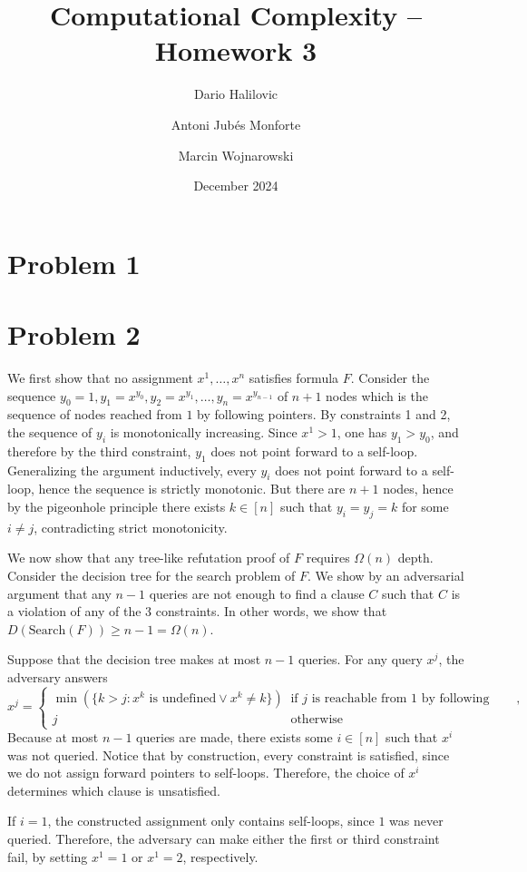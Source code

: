 \documentclass{article}
\title{Computational Complexity -- Homework 3}
\author{Dario Halilovic\and
Antoni Jubés Monforte\and
Marcin Wojnarowski}
\date{December 2024}
\begin{document}
\maketitle

\section*{Problem 1}

\section*{Problem 2}
We first show that no assignment $x^{1}, \ldots, x^{n}$ satisfies formula $F$.
Consider the sequence $y_0 = 1, y_1 = x^{y_0}, y_2 = x^{y_1}, \ldots, y_{n}
= x^{y_{n-1}}$ of $n+1$ nodes which is the sequence of nodes reached from $1$ by
following pointers. By constraints 1 and 2, the sequence of $y_i$ is
monotonically increasing. Since $x^1 > 1$, one has $y_1 > y_0$, and therefore by
the third constraint, $y_1$ does not point forward to a self-loop. Generalizing the
argument inductively, every $y_i$ does not point forward to a self-loop, hence
the sequence is strictly monotonic. But there are $n+1$ nodes, hence by the
pigeonhole principle there exists $k \in [n]$ such that $y_i = y_j = k$ for some
$i \neq j$, contradicting strict monotonicity.

We now show that any tree-like refutation proof of $F$ requires $\Omega(n)$
depth. Consider the decision tree for the search problem of $F$. We show by an
adversarial argument that any $n - 1$ queries are not enough to find a clause
$C$ such that $C$ is a violation of any of the 3 constraints. In other words, we
show that $D(\textrm{Search}(F)) \geq n - 1 = \Omega(n)$.

Suppose that the decision tree makes at most $n - 1$ queries. For any query
$x^{j}$, the adversary answers \[ x^j = \begin{cases} \min(\{k > j : x^k
	\textrm{ is undefined} \lor x^k \neq k\}) & \textrm{if } j \textrm{ is
	reachable from 1 by following pointers}, \\ j     & \textrm{otherwise}
\end{cases} \] Because at most $n - 1$ queries are made, there exists some $i
\in [n]$ such that $x^i$ was not queried. Notice that by construction, every
constraint is satisfied, since we do not assign forward pointers to self-loops.
Therefore, the choice of $x^i$ determines which clause is unsatisfied.

If $i = 1$, the constructed assignment only contains self-loops, since $1$ was
never queried. Therefore, the adversary can make either the first or third
constraint fail, by setting $x^1 = 1$ or $x^1 = 2$, respectively.
\end{document}
